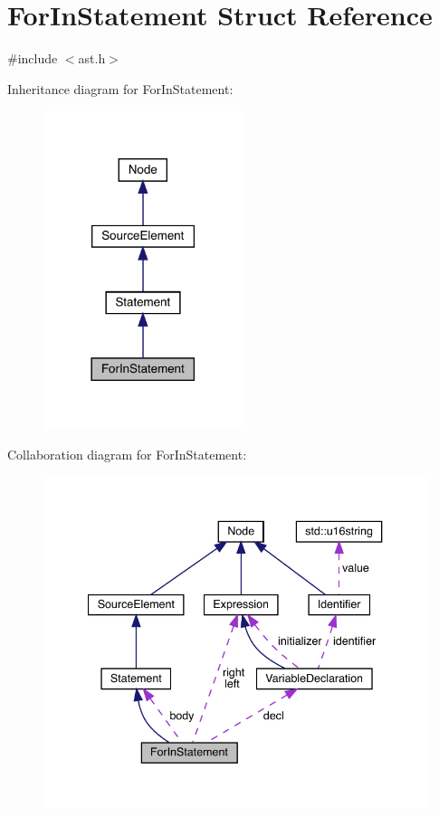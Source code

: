 \hypertarget{struct_for_in_statement}{}\section{For\+In\+Statement Struct Reference}
\label{struct_for_in_statement}


{\ttfamily \#include $<$ast.\+h$>$}



Inheritance diagram for For\+In\+Statement\+:\nopagebreak
\begin{figure}[H]
\begin{center}
\leavevmode
\includegraphics[width=165pt]{struct_for_in_statement__inherit__graph}
\end{center}
\end{figure}


Collaboration diagram for For\+In\+Statement\+:\nopagebreak
\begin{figure}[H]
\begin{center}
\leavevmode
\includegraphics[width=340pt]{struct_for_in_statement__coll__graph}
\end{center}
\end{figure}
